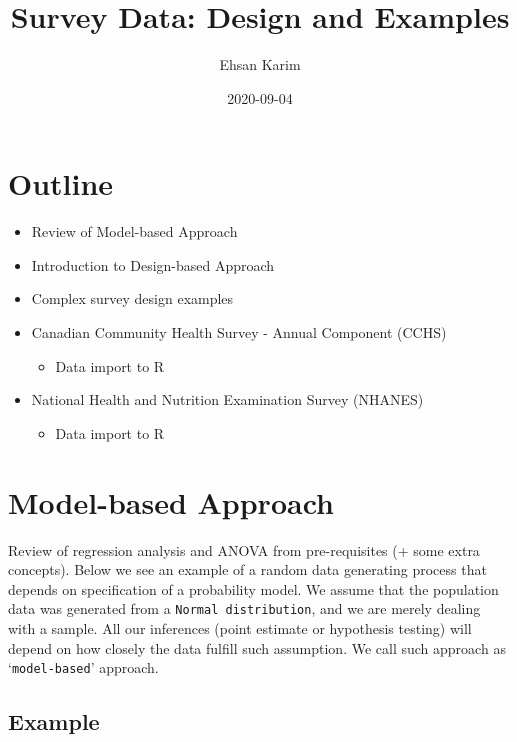 \documentclass[
]{book}
\title{Survey Data: Design and Examples}
\author{Ehsan Karim}
\date{2020-09-04}
\providecommand{\tightlist}{%
  \setlength{\itemsep}{0pt}\setlength{\parskip}{0pt}}
\begin{document}
\maketitle

{
\setcounter{tocdepth}{1}
\tableofcontents
}
\hypertarget{outline}{%
\chapter{Outline}\label{outline}}

\begin{itemize}
\tightlist
\item
  Review of Model-based Approach
\item
  Introduction to Design-based Approach
\item
  Complex survey design examples
\item
  Canadian Community Health Survey - Annual Component (CCHS)

  \begin{itemize}
  \tightlist
  \item
    Data import to R
  \end{itemize}
\item
  National Health and Nutrition Examination Survey (NHANES)

  \begin{itemize}
  \tightlist
  \item
    Data import to R
  \end{itemize}
\end{itemize}

\hypertarget{tab-3}{%
\chapter{Model-based Approach}\label{tab-3}}

Review of regression analysis and ANOVA from pre-requisites (+ some extra concepts). Below we see an example of a random data generating process that depends on specification of a probability model. We assume that the population data was generated from a \texttt{Normal\ distribution}, and we are merely dealing with a sample. All our inferences (point estimate or hypothesis testing) will depend on how closely the data fulfill such assumption. We call such approach as `\texttt{model-based}' approach.

\hypertarget{example}{%
\section{Example}\label{example}}
\end{document}
